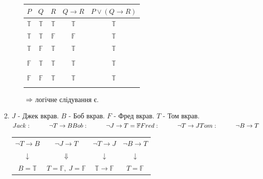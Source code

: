 \documentclass[a4paper,12pt]{article}
\newcommand\tab[1][1cm]{\hspace*{#1}}
\begin{document}
\begin{enumerate}
\begin{enumerate}
\begin{table}[!htb]
\begin{minipage}{.4\linewidth}
        \begin{tabular}{|c|c|c|c|c|}\hline
$P$          & $Q$          & $R$          & $Q\rightarrow R$ & $P\lor(Q\rightarrow R)$ \\\hline
$\mathbb{T}$ & $\mathbb{T}$ & $\mathbb{T}$ & $\mathbb{T}$     & $\mathbb{T}$            \\
$\mathbb{T}$ & $\mathbb{T}$ & $\mathbb{F}$ & $\mathbb{F}$     & $\mathbb{T}$            \\
$\mathbb{T}$ & $\mathbb{F}$ & $\mathbb{T}$ & $\mathbb{T}$     & $\mathbb{T}$            \\
\rowcolor[HTML]{FFCCC9} 
             &              &              &                  &                         \\
$\mathbb{F}$ & $\mathbb{T}$ & $\mathbb{T}$ & $\mathbb{T}$     & $\mathbb{T}$            \\
\rowcolor[HTML]{FFCCC9} 
             &              &              &                  &                         \\
$\mathbb{F}$ & $\mathbb{F}$ & $\mathbb{T}$ & $\mathbb{T}$     & $\mathbb{T}$            \\
\rowcolor[HTML]{FFCCC9} 
             &              &              &                  &        \\\hline                
\end{tabular}
    \end{minipage} 
\end{table}
$\\\Rightarrow$ логічне слідування є.
\end{enumerate}\newpage 
\item $J$ - Джек вкрав. $B$ - Боб вкрав. $F$ -  Фред вкрав. $T$ - Том вкрав.\\
$Jack:\tab \neg T\rightarrow B\\ Bob:\tab \neg J\rightarrow T=\mathbb{F}\\ Fred:\tab \neg T\rightarrow J\\Tom:\tab \neg B\rightarrow T$
\begin{table}[htp]\centering
\begin{tabular}{cccc}
$\neg T\rightarrow B$ & $\neg J\rightarrow T$                          & $\neg T\rightarrow J$                & $\neg B\rightarrow T$ \\
$\downarrow$          & $\Downarrow$                                   & $\downarrow$                         & $\downarrow$          \\
$B=\mathbb{T}$        & $T=\mathbb{F},\>J=\mathbb{F}$                  & $\mathbb{T}\rightarrow\mathbb{F}$    & $T=\mathbb{F}$        \\

\end{tabular}
\end{table}
\end{enumerate}
\end{document}
